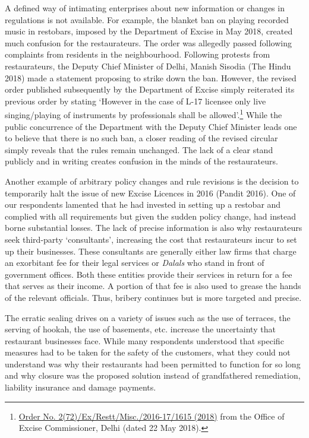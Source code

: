 \documentclass[a4paper, 12pt]{article}
\begin{document}
		A defined way of intimating enterprises about new information or changes in regulations is not available. For example, the blanket ban on playing recorded music in restobars, imposed by the Department of Excise in May 2018, created much confusion for the restaurateurs. The order was allegedly passed following complaints from residents in the neighbourhood. Following protests from restaurateurs, the Deputy Chief Minister of Delhi, Manish Sisodia (The Hindu 2018) made a statement proposing to strike down the ban. However, the revised order published subsequently by the Department of Excise simply reiterated its previous order by stating ‘However in the case of L-17 licensee only live singing/playing of instruments by professionals shall be allowed’.\footnote{\href{https://bit.ly/2QxMK56}{Order No. 2(72)/Ex/Restt/Misc./2016-17/1615 (2018)} from the Office of Excise Commissioner, Delhi (dated 22 May 2018).}  While the public concurrence of the Department with the Deputy Chief Minister leads one to believe that there is no such ban, a closer reading of the revised circular simply reveals that the rules remain unchanged. The lack of a clear stand publicly and in writing creates confusion in the minds of the restaurateurs.
		
		Another example of arbitrary policy changes and rule revisions is the decision to temporarily halt the issue of new Excise Licences in 2016 (Pandit 2016). One of our respondents lamented that he had invested in setting up a restobar and complied with all requirements but given the sudden policy change, had instead borne substantial losses. The lack of precise information is also why restaurateurs seek third-party ‘consultants’, increasing the cost that restaurateurs incur to set up their businesses. These consultants are generally either law firms that charge an exorbitant fee for their legal services or \textit{Dalals} who stand in front of government offices. Both these entities provide their services in return for a fee that serves as their income. A portion of that fee is also used to grease the hands of the relevant officials. Thus, bribery continues but is more targeted and precise.
		
		The erratic sealing drives on a variety of issues such as the use of terraces, the serving of hookah, the use of basements, etc. increase the uncertainty that restaurant businesses face. While many respondents understood that specific measures had to be taken for the safety of the customers, what they could not understand was why their restaurants had been permitted to function for so long and why closure was the proposed solution instead of grandfathered remediation, liability insurance and damage payments.
		
\end{document}
